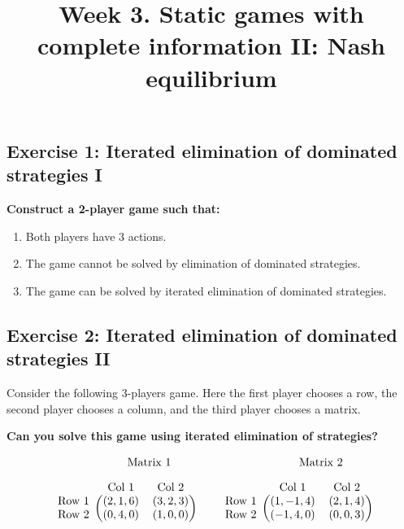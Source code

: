 \documentclass[10pt]{article}
\title{\textbf{Week 3.} Static games with complete information II: Nash equilibrium}
\date{}
\begin{document}
\maketitle
\vspace{-1cm}

\subsection*{Exercise 1: Iterated elimination of dominated strategies I}

\textbf{Construct a 2-player game such that:}

\begin{enumerate}
    \item Both players have 3 actions.
    \item The game cannot be solved by elimination of dominated strategies.
    \item The game can be solved by iterated elimination of dominated strategies.
\end{enumerate}

\subsection*{Exercise 2: Iterated elimination of dominated strategies II}

Consider the following 3-players game. Here the first player chooses a row,
the second player chooses a column, and the third player chooses a matrix.

\textbf{Can you solve this game using iterated elimination of strategies?}

\begin{equation*}
\begin{blockarray}{ccc}
    & \BAmulticolumn{2}{c}{\text{Matrix } 1} \\ [1em]
    & \text{Col } 1 & \text{Col } 2 \\
    \begin{block}{c(cc)}
        \text{Row } 1 & (2, 1, 6) & (3, 2, 3) \\
        \text{Row } 2 & (0, 4, 0) & (1, 0, 0) \\
    \end{block}
\end{blockarray}\qquad
%
\begin{blockarray}{ccc}
    & \BAmulticolumn{2}{c}{\text{Matrix } 2} \\ [1em]
    & \text{Col } 1 & \text{Col } 2 \\
    \begin{block}{c(cc)}
        \text{Row } 1 & (1, -1, 4) & (2, 1, 4) \\
        \text{Row } 2 & (-1, 4, 0) & (0, 0, 3) \\
    \end{block}
\end{blockarray}
\end{equation*}
\end{document}
